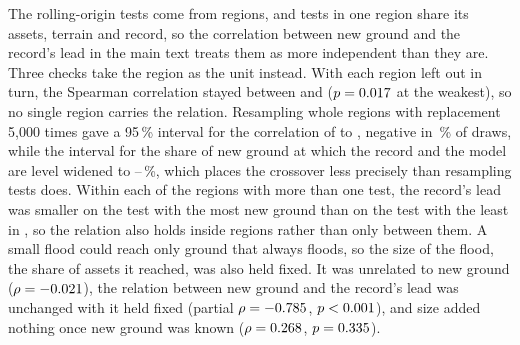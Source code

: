 \documentclass[11pt]{article}
\begin{document}
The \PoolTests{} rolling-origin tests come from \PoolRegions{} regions, and tests in one region share its assets, terrain and record, so the correlation between new ground and the record's lead in the main text treats them as more independent than they are. Three checks take the region as the unit instead. With each region left out in turn, the Spearman correlation stayed between \RegionLeftOutRhoMin{} and \RegionLeftOutRhoMax{} ($p=0.017{}$ at the weakest), so no single region carries the relation. Resampling whole regions with replacement 5,000 times gave a 95\,\% interval for the correlation of \RegionBootRhoLow{} to \RegionBootRhoHigh{}, negative in \RegionBootNegative{}\,\% of draws, while the interval for the share of new ground at which the record and the model are level widened to \RegionBootCrossingLow{}--\RegionBootCrossingHigh{}\,\%, which places the crossover less precisely than resampling tests does. Within each of the \RegionSeveralTests{} regions with more than one test, the record's lead was smaller on the test with the most new ground than on the test with the least in \RegionLeadFalls{}, so the relation also holds inside regions rather than only between them. A small flood could reach only ground that always floods, so the size of the flood, the share of assets it reached, was also held fixed. It was unrelated to new ground ($\rho=-0.021{}$), the relation between new ground and the record's lead was unchanged with it held fixed (partial $\rho=-0.785{}$, $p<0.001{}$), and size added nothing once new ground was known ($\rho=0.268{}$, $p=0.335{}$).



\end{document}
